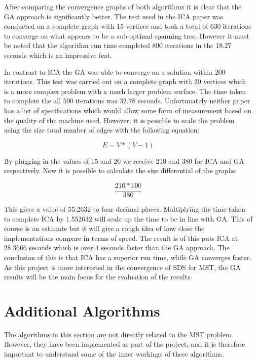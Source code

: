 \documentclass{AISB2008}
\begin{document}
{After comparing the convergence graphs of both algorithms it is clear that the GA approach is significantly better. The test used in the ICA paper was conducted on a complete graph with 15 vertices and took a total of 630 iterations to converge on what appears to be a sub-optimal spanning tree. However it must be noted that the algorithm run time completed 800 iterations in the 18.27 seconds which is an impressive feat.

In contrast to ICA the GA was able to converge on a solution within 200 iterations. This test was carried out on a complete graph with 20 vertices which is a more complex problem with a much larger problem surface. The time taken to complete the all 500 iterations was 32.78 seconds. Unfortunately neither paper has a list of specifications which would allow some form of measurement based on the quality of the machine used. However, it is possible to scale the problem using the size total number of edges with the following equation:

\begin{equation}
E = V * (V - 1)
\end{equation}

By plugging in the values of 15 and 20 we receive 210 and 380 for ICA and GA respectively. Now it is possible to calculate the size differential of the graphs:

\begin{equation}
\frac{210 * 100}{380}
\end{equation}

This gives a value of 55.2632 to four decimal places. Multiplying the time taken to complete ICA by 1.552632 will scale up the time to be in line with GA. This of course is an estimate but it will give a rough idea of how close the implementations compare in terms of speed. The result is of this puts ICA at 28.3666 seconds which is over 4 seconds faster than the GA approach.
The conclusion of this is that ICA has a superior run time, while GA converges faster. As this project is more interested in the convergence of SDS for MST, the GA results will be the main focus for the evaluation of the results.


\section{Additional Algorithms}

The algorithms in this section are not directly related to the MST problem. However, they have been implemented as part of the project, and it is therefore important to understand some of the inner workings of these algorithms.


}
\end{document}
